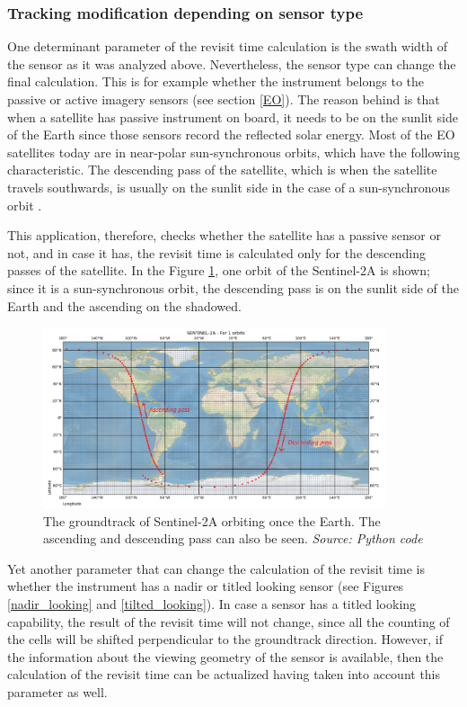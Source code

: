\bigskip
\subsubsection{Tracking modification depending on sensor type}
\bigskip

One determinant parameter of the revisit time calculation is the swath width of the sensor as it was analyzed above. Nevertheless, the sensor type can change the final calculation. This is for example whether the instrument belongs to the passive or active imagery sensors (see section \ref{EO}). The reason behind is that when a satellite has passive instrument on board, it needs to be on the sunlit side of the Earth since those sensors record the reflected solar energy. Most of the EO satellites today are in near-polar sun-synchronous orbits, which have the following characteristic. The descending pass of the satellite, which is when the satellite travels southwards, is usually on the sunlit side in the case of a sun-synchronous orbit \cite{Kramer 2002}.

This application, therefore, checks whether the satellite has a passive sensor or not, and in case it has, the revisit time is calculated only for the descending passes of the satellite. In the Figure \ref{ascending-descending}, one orbit of the Sentinel-2A is shown; since it is a sun-synchronous orbit, the descending pass is on the sunlit side of the Earth and the ascending on the shadowed.

\begin{figure}
\centering
\includegraphics[width=0.9\textwidth]{Images/ascending-descending.png}\caption{The groundtrack of Sentinel-2A orbiting once the Earth. The ascending and descending pass can also be seen. \textit{Source: Python code}}
\label{ascending-descending}
\end{figure}

Yet another parameter that can change the calculation of the revisit time is whether the instrument has a nadir or titled looking sensor (see Figures \ref{nadir_looking} and \ref{tilted_looking}). In case a sensor has a titled looking capability, the result of the revisit time will not change, since all the counting of the cells will be shifted perpendicular to the groundtrack direction. However, if the information about the viewing geometry of the sensor is available, then the calculation of the revisit time can be actualized having taken into account this parameter as well.

